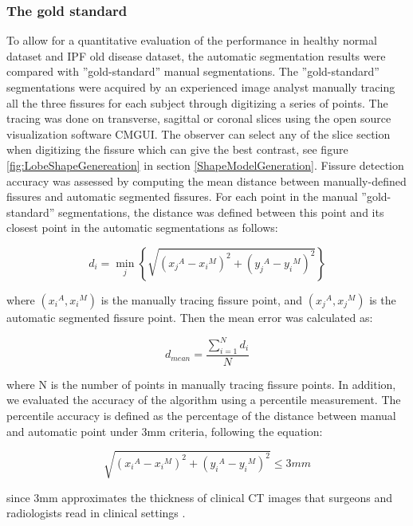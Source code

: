 {\subsubsection{The gold standard}
To allow for a quantitative evaluation of the performance in healthy normal dataset and IPF old disease dataset, the automatic segmentation results were compared with ''gold-standard'' manual segmentations. The ''gold-standard'' segmentations were acquired by an experienced image analyst manually tracing all the three fissures for each subject through digitizing a series of points. The tracing was done on transverse, sagittal or coronal
slices using the open source visualization software CMGUI. The observer can select any of the slice section when digitizing the fissure which can give the best contrast, see figure \ref{fig:LobeShapeGenereation} in section \ref{ShapeModelGeneration}. Fissure detection accuracy was assessed by computing the mean distance between manually-defined fissures and automatic segmented fissures. For each point in the manual ''gold-standard'' segmentations, the distance was defined between this point and its closest point in the automatic segmentations as follows:

\begin{equation}
\label{eq:Distance1}
d_i =  \operatorname*{min}\limits_{j}\left\{\sqrt{{({x_j}^A-{x_i}^M)}^2 + {({y_j}^A-{y_i}^M)}^2}\right\}
\end{equation}

where $({x_i}^A, {x_i}^M)$ is the manually tracing fissure point, and $({x_j}^A, {x_j}^M)$ is the automatic segmented fissure point. Then the mean error was calculated as:

\begin{equation}
\label{eq:MeanDistance}
d_{mean} = \frac{\sum\nolimits_{i=1}^N d_i}{N}
\end{equation}

where N is the number of points in manually tracing fissure points. In addition, we evaluated the accuracy of the algorithm using a percentile measurement. The percentile accuracy is defined as the percentage of the distance between manual and automatic point under 3mm criteria, following the equation:

\begin{equation}
\label{eq:PercentileMeasurement}
\sqrt{({{x_i}^A-{x_i}^M})^2 + ({{y_i}^A-{y_i}^M})^2} \leq 3mm
\end{equation}

since 3mm approximates the thickness of clinical CT images that surgeons and radiologists read in clinical settings \citep{wei2009segmentation}.

}
